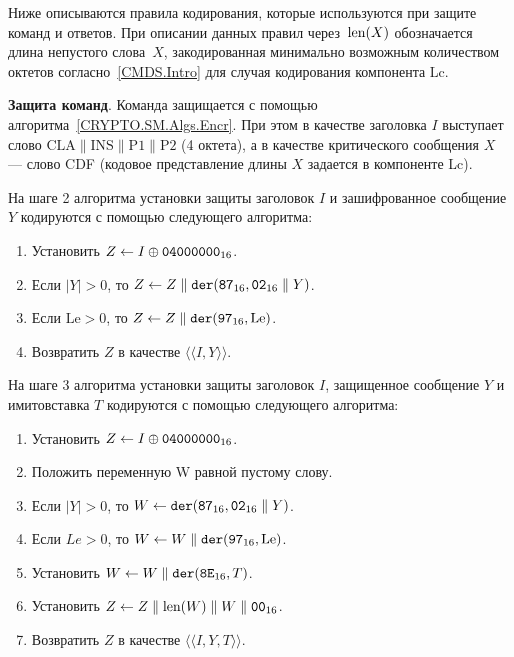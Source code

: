 Ниже описываются правила кодирования, которые используются при защите 
команд и ответов. При описании данных правил через~$\text{len}(X)$ обозначается 
длина непустого слова~$X$, закодированная минимально возможным количеством 
октетов согласно~\ref{CMDS.Intro} для случая кодирования компонента Lc. 

{\bf Защита команд}. 
Команда защищается с помощью алгоритма~\ref{CRYPTO.SM.Algs.Encr}. 
При этом в 
качестве заголовка $I$ выступает слово 
$\text{CLA} \parallel \text{INS} \parallel \text{P1} \parallel \text{P2}$ 
(4 октета), а 
в качестве критического сообщения $X$ --- слово CDF (кодовое представление 
длины $X$ задается в компоненте Lc). 

На шаге 2 алгоритма установки защиты заголовок $I$ и зашифрованное сообщение 
$Y$ кодируются с помощью следующего алгоритма: 

\begin{enumerate}
\item
Установить $Z \gets I \oplus \texttt{04000000}_{16}$.

\item
Если $|Y| > 0$, то $Z \gets Z \parallel \texttt{der}(\texttt{87}_{16}, \texttt{02}_{16}\parallel Y)$.
\item
Если $\text{Le} > 0$, то $Z\gets Z \parallel \texttt{der}(\texttt{97}_{16}, \text{Le})$.

\item
Возвратить $Z$ в качестве $\langle\langle I, Y \rangle\rangle$.
\end{enumerate}

На шаге 3 алгоритма установки защиты заголовок $I$, защищенное сообщение $Y$ и 
имитовставка $T$ кодируются с помощью следующего алгоритма: 

\begin{enumerate}
\item
Установить $Z\gets I \oplus \texttt{04000000}_{16}$.
\item
Положить переменную W равной пустому слову.
\item
Если $|Y| > 0$, то $W\gets \texttt{der}(\texttt{87}_{16}, \texttt{02}_{16} \parallel Y)$.
\item
Если $Le > 0$, то $W\gets W \parallel \texttt{der}(\texttt{97}_{16}, \text{Le})$.
\item
Установить $W\gets W \parallel \texttt{der}(\texttt{8E}_{16}, T)$.
\item
Установить $Z\gets Z \parallel \text{len}(W) \parallel W \parallel \texttt{00}_{16}$.
\item
Возвратить $Z$ в качестве $\langle\langle I, Y, T \rangle\rangle$.
\end{enumerate}

